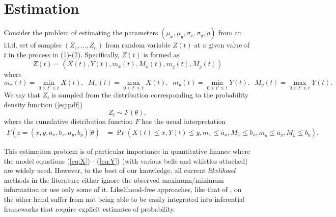 \documentclass[10pt]{article}
\begin{document}


\section{Estimation}
Consider the problem of estimating the parameters
$(\mu_x, \mu_y, \sigma_x, \sigma_y, \rho)$ from an i.i.d. set of
samples $(Z_1, \ldots, Z_n)$ from random variable $Z(t)$ at a given
value of $t$ in the process in (1)-(2). Specifically, $Z(t)$ is formed
as
$$ Z(t) =( X(t), Y(t), m_x(t), M_x(t), m_y(t), M_y(t)) $$
where 
$$m_x(t)= \min_{0 \le t' \le t} X(t), \;\; 
M_x(t)= \max_{0 \le t' \le t} X(t), \;\; m_y(t)= \min_{0 \le t' \le t}
Y(t), \;\; M_y(t)= \max_{0 \le t' \le t} Y(t). $$ We say that $Z_i$ is
sampled from the distribution corresponding to the probability density
function (\ref{eq:pdf})
\[
  Z_i \sim F(\theta),
\]
where the cumulative distribution function $F$ has the usual interpretation
\begin{align*}
  F(z = (x, y, a_x, b_x, a_y, b_y) | \theta) &= \Pr\left(X(t) \leq x,
    Y(t) \leq y, m_x \leq a_x, M_x \leq b_x, m_y \leq a_y, M_y \leq b_y\right).
\end{align*}

This estimation problem is of particular importance in quantitative
finance where the model equations (\ref{eq:X}) - (\ref{eq:Y}) (with
various bells and whistles attached) are widely used. However, to the
best of our knowledge, all current \textit{likelihood} methods in the
literature either ignore the observed maximum/minimum information or
use only some of it. Likelihood-free approaches, like that of
\cite{rogers1991estimating}, on the other hand suffer from not being
able to be easily integrated into inferential frameworks that require
explicit estimates of probability.
\end{document}
